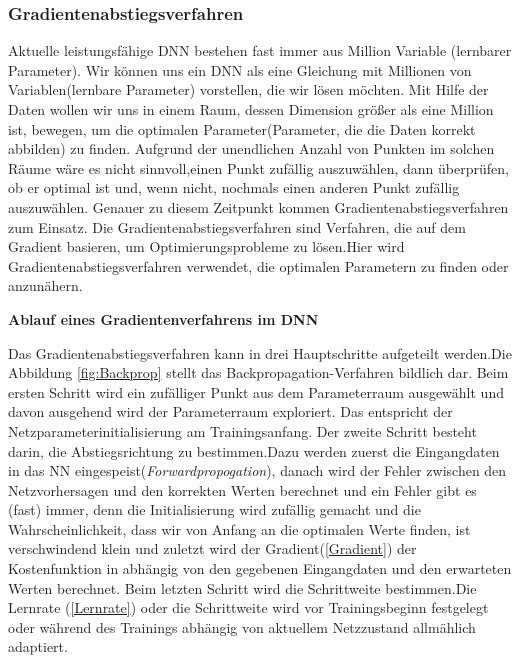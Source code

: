 \documentclass[12pt,a4paper]{scrartcl}
\numberwithin{equation}{section}
\begin{document}
\subsubsection{Gradientenabstiegsverfahren}\label{Gradientenabstiegsverfahren}
Aktuelle leistungsfähige \ac{DNN} bestehen fast immer aus Million Variable (lernbarer Parameter). Wir können uns ein \ac{DNN} als eine Gleichung mit Millionen von Variablen(lernbare Parameter) vorstellen, die wir lösen möchten. Mit Hilfe der Daten wollen wir uns in einem Raum, dessen Dimension größer als eine Million ist, bewegen, um die optimalen Parameter(Parameter, die die Daten korrekt abbilden) zu finden. Aufgrund der unendlichen Anzahl von Punkten im solchen Räume wäre es nicht sinnvoll,einen Punkt zufällig auszuwählen, dann überprüfen, ob er optimal ist und, wenn nicht, nochmals einen anderen Punkt zufällig auszuwählen. Genauer zu diesem Zeitpunkt kommen Gradientenabstiegsverfahren zum Einsatz.
Die Gradientenabstiegsverfahren sind Verfahren, die auf dem Gradient basieren, um Optimierungsprobleme zu lösen.Hier wird Gradientenabstiegsverfahren verwendet, die optimalen Parametern zu finden oder anzunähern.

\begin{center}
	\textbf{Ablauf eines Gradientenverfahrens im \ac{DNN} }
\end{center}
Das Gradientenabstiegsverfahren kann in drei Hauptschritte aufgeteilt werden.Die Abbildung \ref{fig:Backprop} stellt das Backpropagation-Verfahren bildlich dar.
Beim ersten Schritt  wird ein zufälliger Punkt aus dem Parameterraum ausgewählt und davon ausgehend wird der Parameterraum exploriert. Das entspricht der Netzparameterinitialisierung am Trainingsanfang.
Der zweite Schritt besteht darin, die Abstiegsrichtung zu bestimmen.Dazu werden zuerst die Eingangdaten in das \ac{NN} eingespeist(\textit{Forwardpropogation}), danach wird der Fehler zwischen den Netzvorhersagen und den korrekten Werten berechnet und ein Fehler gibt es (fast) immer, denn die Initialisierung wird zufällig gemacht und die Wahrscheinlichkeit, dass wir von Anfang an die optimalen Werte finden, ist verschwindend klein und zuletzt wird der Gradient(\ref{Gradient}) der Kostenfunktion in abhängig von den gegebenen Eingangdaten und den erwarteten Werten berechnet. 
Beim letzten Schritt wird die Schrittweite bestimmen.Die Lernrate (\ref{Lernrate}) oder die Schrittweite wird vor Trainingsbeginn festgelegt oder während des Trainings abhängig von aktuellem Netzzustand allmählich adaptiert.
\end{document}
